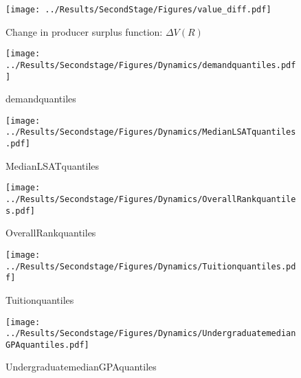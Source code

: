 \documentclass[12pt]{article}
\theoremstyle{definition}
\begin{document}
\clearpage





\clearpage
\begin{figure}[htbp]
  \begin{center}
    \texttt{[image: ../Results/SecondStage/Figures/value\_diff.pdf]}
    \caption{Change in producer surplus function: $\Delta V(R)$}
    \label{fig:V_delta}
  \end{center}
\end{figure}

\begin{figure}[htbp]
\begin{center}
\texttt{[image: ../Results/Secondstage/Figures/Dynamics/demandquantiles.pdf]}
\caption{demandquantiles}
\label{fig:demandquantiles}
\end{center}
\end{figure}

\begin{figure}[htbp]
\begin{center}
\texttt{[image: ../Results/Secondstage/Figures/Dynamics/MedianLSATquantiles.pdf]}
\caption{MedianLSATquantiles}
\label{fig:MedianLSATquantiles}
\end{center}
\end{figure}

\begin{figure}[htbp]
\begin{center}
\texttt{[image: ../Results/Secondstage/Figures/Dynamics/OverallRankquantiles.pdf]}
\caption{OverallRankquantiles}
\label{fig:OverallRankquantiles}
\end{center}
\end{figure}

\begin{figure}[htbp]
\begin{center}
\texttt{[image: ../Results/Secondstage/Figures/Dynamics/Tuitionquantiles.pdf]}
\caption{Tuitionquantiles}
\label{fig:Tuitionquantiles}
\end{center}
\end{figure}

\begin{figure}[htbp]
\begin{center}
\texttt{[image: ../Results/Secondstage/Figures/Dynamics/UndergraduatemedianGPAquantiles.pdf]}
\caption{UndergraduatemedianGPAquantiles}
\label{fig:UndergraduatemedianGPAquantiles}
\end{center}
\end{figure}
\end{document}
